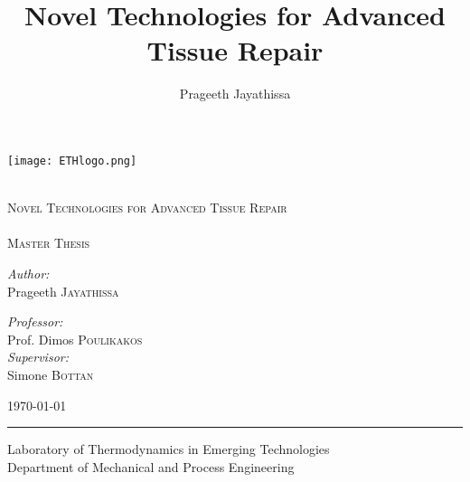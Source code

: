 \begin{titlepage}
\vspace*{-2.5cm}
\hspace*{-1cm}

\texttt{[image: ETHlogo.png]}\\[3cm]

\begin{center}
\HRule \\[0.4cm]
\textsc{\LARGE Novel Technologies for Advanced Tissue Repair}\\[0.4cm]
\HRule\\[1.5cm]
\textsc{\Large Master Thesis}\\[0.5cm]
\vfill

\begin{minipage}{0.4\textwidth}
\begin{flushleft} \large
\emph{Author:}\\
Prageeth \textsc{Jayathissa}\\
 
\end{flushleft}
\end{minipage}
\begin{minipage}{0.4\textwidth}
\begin{flushright} \large
\emph{Professor:} \\
Prof.  Dimos \textsc{Poulikakos}\\[0.5cm]

\emph{Supervisor:} \\
Simone \textsc{Bottan}\\

\end{flushright}
\end{minipage}

\vfill

{\large \today}

\end{center}

\begin{minipage}[c]{\textwidth}
\hspace{-1.5cm}
\rule{15cm}{0.5pt}
\end{minipage}

\begin{center}
Laboratory of Thermodynamics in Emerging Technologies\\
Department of Mechanical and Process Engineering
\end{center}
\end{titlepage}

\blankpage

\title{Novel Technologies for Advanced Tissue Repair}
\author{Prageeth Jayathissa}
\maketitle
